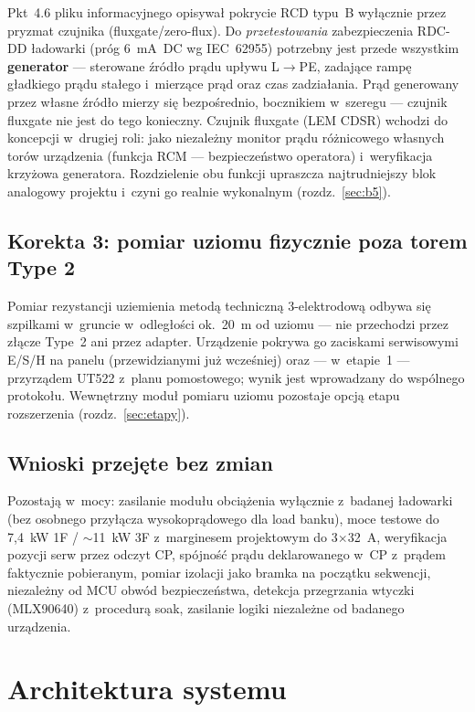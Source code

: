 \documentclass[11pt,a4paper]{article}
\begin{document}
Pkt~4.6 pliku informacyjnego opisywał pokrycie RCD typu~B wyłącznie przez pryzmat czujnika (fluxgate/zero-flux). Do \emph{przetestowania} zabezpieczenia RDC-DD ładowarki (próg 6~mA~DC wg IEC~62955) potrzebny jest przede wszystkim \textbf{generator} --- sterowane źródło prądu upływu L$\rightarrow$PE, zadające rampę gładkiego prądu stałego i~mierzące prąd oraz czas zadziałania. Prąd generowany przez własne źródło mierzy się bezpośrednio, bocznikiem w~szeregu --- czujnik fluxgate nie jest do tego konieczny. Czujnik fluxgate (LEM CDSR) wchodzi do koncepcji w~drugiej roli: jako niezależny monitor prądu różnicowego własnych torów urządzenia (funkcja RCM --- bezpieczeństwo operatora) i~weryfikacja krzyżowa generatora. Rozdzielenie obu funkcji upraszcza najtrudniejszy blok analogowy projektu i~czyni go realnie wykonalnym (rozdz.~\ref{sec:b5}).

\subsection{Korekta 3: pomiar uziomu fizycznie poza torem Type 2}
\label{sec:korekta3}

Pomiar rezystancji uziemienia metodą techniczną 3-elektrodową odbywa się szpilkami w~gruncie w~odległości ok.~20~m od uziomu --- nie przechodzi przez złącze Type~2 ani przez adapter. Urządzenie pokrywa go zaciskami serwisowymi E/S/H na panelu (przewidzianymi już wcześniej) oraz --- w~etapie~1 --- przyrządem UT522 z~planu pomostowego; wynik jest wprowadzany do wspólnego protokołu. Wewnętrzny moduł pomiaru uziomu pozostaje opcją etapu rozszerzenia (rozdz.~\ref{sec:etapy}).

\subsection{Wnioski przejęte bez zmian}

Pozostają w~mocy: zasilanie modułu obciążenia wyłącznie z~badanej ładowarki (bez osobnego przyłącza wysokoprądowego dla load banku), moce testowe do 7,4~kW 1F / $\sim$11~kW 3F z~marginesem projektowym do 3$\times$32~A, weryfikacja pozycji serw przez odczyt CP, spójność prądu deklarowanego w~CP z~prądem faktycznie pobieranym, pomiar izolacji jako bramka na początku sekwencji, niezależny od MCU obwód bezpieczeństwa, detekcja przegrzania wtyczki (MLX90640) z~procedurą soak, zasilanie logiki niezależne od badanego urządzenia.

\section{Architektura systemu}
\label{sec:architektura}
\end{document}
